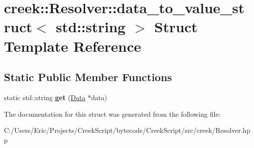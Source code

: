 \hypertarget{structcreek_1_1_resolver_1_1data__to__value__struct_3_01std_1_1string_01_4}{}\section{creek\+:\+:Resolver\+:\+:data\+\_\+to\+\_\+value\+\_\+struct$<$ std\+:\+:string $>$ Struct Template Reference}
\label{structcreek_1_1_resolver_1_1data__to__value__struct_3_01std_1_1string_01_4}
\subsection*{Static Public Member Functions}
\begin{DoxyCompactItemize}
\item 
static std\+::string {\bfseries get} (\hyperlink{classcreek_1_1_data}{Data} $\ast$data)\hypertarget{structcreek_1_1_resolver_1_1data__to__value__struct_3_01std_1_1string_01_4_abac6dfe248d40cb43af9814ada82ae5b}{}\label{structcreek_1_1_resolver_1_1data__to__value__struct_3_01std_1_1string_01_4_abac6dfe248d40cb43af9814ada82ae5b}

\end{DoxyCompactItemize}


The documentation for this struct was generated from the following file\+:\begin{DoxyCompactItemize}
\item 
C\+:/\+Users/\+Eric/\+Projects/\+Creek\+Script/bytecode/\+Creek\+Script/src/creek/Resolver.\+hpp\end{DoxyCompactItemize}
